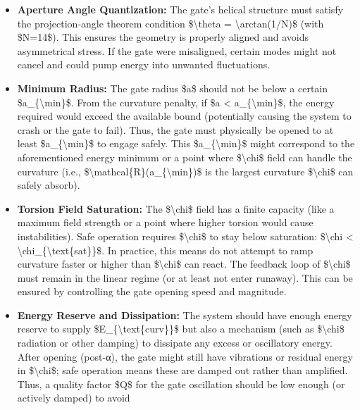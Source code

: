 \documentclass[]{article}
\begin{document}
\begin{itemize}
\item
  \textbf{Aperture Angle Quantization:} The gate's helical structure
  must satisfy the projection-angle theorem condition
  \$\textbackslash{}theta = \textbackslash{}arctan(1/N)\$ (with
  \$N=14\$). This ensures the geometry is properly aligned and avoids
  asymmetrical stress. If the gate were misaligned, certain modes might
  not cancel and could pump energy into unwanted fluctuations.
\item
  \textbf{Minimum Radius:} The gate radius \$a\$ should not be below a
  certain \$a\_\{\textbackslash{}min\}\$. From the curvature penalty, if
  \$a \textless{} a\_\{\textbackslash{}min\}\$, the energy required
  would exceed the available bound (potentially causing the system to
  crash or the gate to fail). Thus, the gate must physically be opened
  to at least \$a\_\{\textbackslash{}min\}\$ to engage safely. This
  \$a\_\{\textbackslash{}min\}\$ might correspond to the aforementioned
  energy minimum or a point where \$\textbackslash{}chi\$ field can
  handle the curvature (i.e.,
  \$\textbackslash{}mathcal\{R\}(a\_\{\textbackslash{}min\})\$ is the
  largest curvature \$\textbackslash{}chi\$ can safely absorb).
\item
  \textbf{Torsion Field Saturation:} The \$\textbackslash{}chi\$ field
  has a finite capacity (like a maximum field strength or a point where
  higher torsion would cause instabilities). Safe operation requires
  \$\textbackslash{}chi\$ to stay below saturation:
  \$\textbar{}\textbackslash{}chi\textbar{} \textless{}
  \textbackslash{}chi\_\{\textbackslash{}text\{sat\}\}\$. In practice,
  this means do not attempt to ramp curvature faster or higher than
  \$\textbackslash{}chi\$ can react. The feedback loop of
  \$\textbackslash{}chi\$ must remain in the linear regime (or at least
  not enter runaway). This can be ensured by controlling the gate
  opening speed and magnitude.
\item
  \textbf{Energy Reserve and Dissipation:} The system should have enough
  energy reserve to supply \$E\_\{\textbackslash{}text\{curv\}\}\$ but
  also a mechanism (such as \$\textbackslash{}chi\$ radiation or other
  damping) to dissipate any excess or oscillatory energy. After opening
  (post-α), the gate might still have vibrations or residual energy in
  \$\textbackslash{}chi\$; safe operation means these are damped out
  rather than amplified. Thus, a quality factor \$Q\$ for the gate
  oscillation should be low enough (or actively damped) to avoid

\end{itemize}
\end{document}
